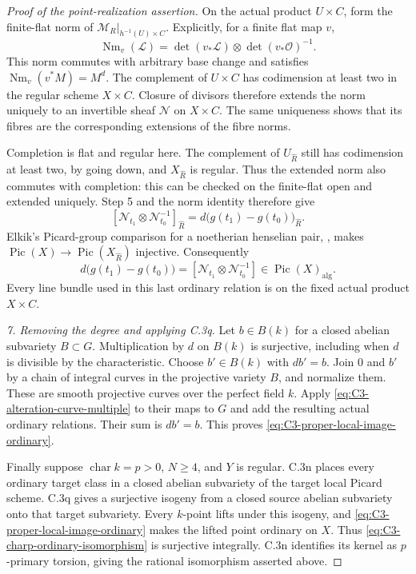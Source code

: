 \begin{proof}[Proof of the point-realization assertion]
On the actual product $U\times C$, form
the finite-flat norm of
$\mathcal M_R|_{h^{-1}(U)\times C}$.
Explicitly, for a finite flat map $v$,
\[
                 \operatorname{Nm}_v(\mathcal L)
                  =\det(v_*\mathcal L)\otimes\det(v_*\mathcal O)^{-1}.
\]
This norm commutes with arbitrary base
change and satisfies
$\operatorname{Nm}_v(v^*M)=M^d$.
The complement of $U\times C$ has
codimension at least two in the regular
scheme $X\times C$. Closure of divisors
therefore extends the norm uniquely to
an invertible sheaf $\mathcal N$ on
$X\times C$. The same uniqueness shows
that its fibres are the corresponding
extensions of the fibre norms.

Completion is flat and regular here.
The complement of $U_{\widehat R}$ still
has codimension at least two, by going
down, and $X_{\widehat R}$ is regular.
Thus the extended norm also commutes
with completion: this can be checked on
the finite-flat open and extended
uniquely. Step 5 and the norm identity
therefore give
\[
 [\mathcal N_{t_1}\otimes\mathcal N_{t_0}^{-1}]_{\widehat R}
                  =d\bigl(g(t_1)-g(t_0)\bigr)_{\widehat R}.
\]
Elkik's Picard-group comparison for a
noetherian henselian pair,
\citet[Section III, unnumbered corollary,
p.~573]{D_Elkik1973}, makes
$\operatorname{Pic}(X)\to\operatorname{Pic}(X_{\widehat R})$
injective. Consequently
\begin{equation}\label{eq:C3-alteration-curve-multiple}
 d\bigl(g(t_1)-g(t_0)\bigr)
      =[\mathcal N_{t_1}\otimes\mathcal N_{t_0}^{-1}]
             \in\operatorname{Pic}(X)_{\mathrm{alg}}.
\end{equation}
Every line bundle used in this last
ordinary relation is on the fixed actual
product $X\times C$.

\emph{7. Removing the degree and applying C.3q.}
Let $b\in B(k)$ for a closed abelian
subvariety $B\subset G$. Multiplication
by $d$ on $B(k)$ is surjective, including
when $d$ is divisible by the characteristic.
Choose $b'\in B(k)$ with $db'=b$.
Join $0$ and $b'$ by a chain of integral
curves in the projective variety $B$,
and normalize them. These are smooth
projective curves over the perfect field
$k$. Apply \eqref{eq:C3-alteration-curve-multiple}
to their maps to $G$ and add the
resulting actual ordinary relations.
Their sum is $db'=b$. This proves
\eqref{eq:C3-proper-local-image-ordinary}.

Finally suppose $\operatorname{char}k=p>0$,
$N\ge4$, and $Y$ is regular. C.3n places
every ordinary target class in a closed
abelian subvariety of the target local
Picard scheme. C.3q gives a surjective
isogeny from a closed source abelian
subvariety onto that target subvariety.
Every $k$-point lifts under this isogeny,
and \eqref{eq:C3-proper-local-image-ordinary}
makes the lifted point ordinary on $X$.
Thus \eqref{eq:C3-charp-ordinary-isomorphism}
is surjective integrally. C.3n identifies
its kernel as $p$-primary torsion, giving
the rational isomorphism asserted above.
\end{proof}

